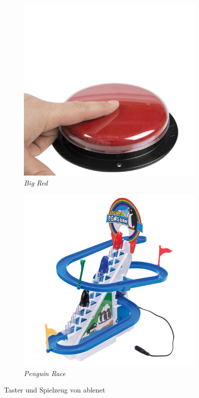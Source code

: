             \begin{figure}[H]
				\centering
				\begin{subfigure}{.49\textwidth}
  					\centering
  					\includegraphics[width=.8\linewidth]{images/big-red-button.jpg}
  					\caption{\emph{Big Red} \cite{ablenet:bigRed}}
                    
  					\label{fig:bigRed}
				\end{subfigure}
				\begin{subfigure}{.49\textwidth}
  					\centering
  					\includegraphics[width=.8\linewidth]{images/penguin-race.png}
  					\caption{\emph{Penguin Race} \cite{ablenet:penguinRace}}
  					\label{fig:penguinRace}
				\end{subfigure}
                \caption{Taster und Spielzeug von ablenet}
				\label{fig:ablenetSingleButtons}
			\end{figure}
            
